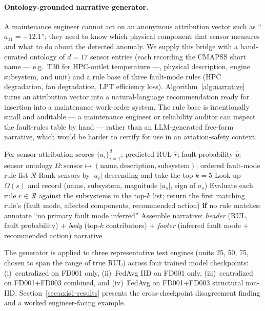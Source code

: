 \documentclass[a4paper,fleqn,doubleblind]{cas-sc}
\begin{document}
\paragraph{Ontology-grounded narrative generator.}
A maintenance engineer cannot act on an anonymous attribution
vector such as ``$a_{11} = -12.1$''; they need to know which
physical component that sensor measures and what to do about the
detected anomaly. We supply this bridge with a hand-curated
ontology of $d = 17$ sensor entries (each recording the CMAPSS
short name --- e.g.\ T30 for HPC-outlet temperature ---, physical
description, engine subsystem, and unit) and a rule base of three
fault-mode rules (HPC degradation, fan degradation, LPT efficiency
loss). Algorithm~\ref{alg:narrative} turns an attribution vector
into a natural-language recommendation ready for insertion into a
maintenance work-order system. The rule base is intentionally
small and auditable --- a maintenance engineer or reliability
auditor can inspect the fault-rules table by hand --- rather than
an LLM-generated free-form narrative, which would be harder to
certify for use in an aviation-safety context.

\begin{algorithm}[!ht]
\caption{Ontology-grounded engineer narrative from sensor attributions.}
\label{alg:narrative}
\begin{algorithmic}[1]
\Require Per-sensor attribution scores $\{a_i\}_{i=1}^d$; predicted RUL $\hat{r}$; fault probability $\hat{p}$; sensor ontology $\Omega: \text{sensor} \mapsto (\text{name}, \text{description}, \text{subsystem})$; ordered fault-mode rule list $\mathcal{R}$
\State Rank sensors by $|a_i|$ descending and take the top $k = 5$
    \State Look up $\Omega(s)$ and record (name, subsystem, magnitude $|a_s|$, sign of $a_s$)
\EndFor
\State Evaluate each rule $r \in \mathcal{R}$ against the subsystems in the top-$k$ list; return the first matching rule's (fault mode, affected components, recommended action)
\State \textbf{if} no rule matches: annotate ``no primary fault mode inferred''
\State Assemble narrative: \emph{header} (RUL, fault probability) $+$ \emph{body} (top-$k$ contributors) $+$ \emph{footer} (inferred fault mode $+$ recommended action)
\State \Return narrative
\end{algorithmic}
\end{algorithm}

The generator is applied to three representative test engines
(units 25, 50, 75, chosen to span the range of true RUL) across
four trained model checkpoints:
(i)~centralized on FD001 only,
(ii)~FedAvg IID on FD001 only,
(iii)~centralized on FD001+FD003 combined, and
(iv)~FedAvg on FD001+FD003 structural non-IID.
Section~\ref{sec:axis1-results} presents the cross-checkpoint
disagreement finding and a worked engineer-facing example.
\end{document}
